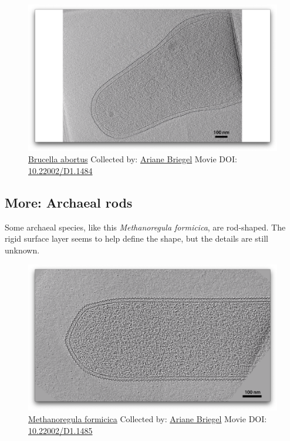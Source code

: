 \documentclass[]{tufte-book}
\begin{document}
\begin{figure}
\includegraphics{movie_stills/3_2a} \caption[\protect\hyperlink{tree}{Brucella abortus} Collected by:
\protect\hyperlink{ariane_briegel}{Ariane Briegel} Movie DOI:
\href{https://doi.org/10.22002/D1.1484}{10.22002/D1.1484}]{\protect\hyperlink{tree}{Brucella abortus} Collected by:
\protect\hyperlink{ariane_briegel}{Ariane Briegel} Movie DOI:
\href{https://doi.org/10.22002/D1.1484}{10.22002/D1.1484}}\label{fig:3-2a}
\end{figure}

\hypertarget{Archaeal_rods}{\subsection*{More: Archaeal
rods}\label{Archaeal_rods}}

Some archaeal species, like this \emph{Methanoregula formicica}, are
rod-shaped. The rigid surface layer seems to help define the shape, but
the details are still unknown.





\begin{figure}
\includegraphics{movie_stills/3_2b} \caption[\protect\hyperlink{tree}{Methanoregula formicica} Collected
by: \protect\hyperlink{ariane_briegel}{Ariane Briegel} Movie DOI:
\href{https://doi.org/10.22002/D1.1485}{10.22002/D1.1485}]{\protect\hyperlink{tree}{Methanoregula formicica} Collected
by: \protect\hyperlink{ariane_briegel}{Ariane Briegel} Movie DOI:
\href{https://doi.org/10.22002/D1.1485}{10.22002/D1.1485}}\label{fig:3-2b}
\end{figure}
\end{document}
